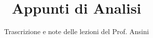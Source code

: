 \documentclass[a4paper,12pt]{article}
\title{Appunti di Analisi}
\author{Trascrizione e note delle lezioni del Prof. Ansini}
\date{}
\begin{document}
\maketitle
\projectintro
\tableofcontents
\newpage

% 
% 
% 
% 
% 
\end{document}
